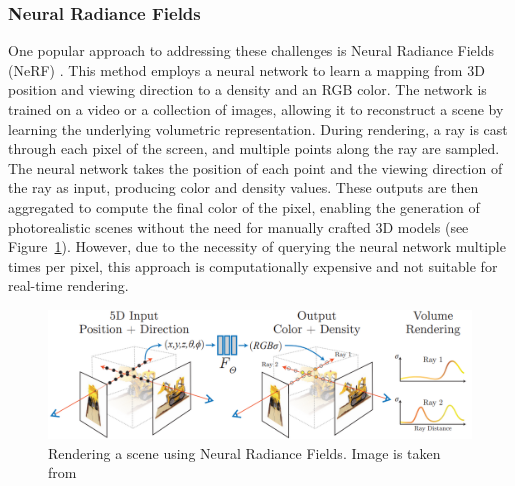 \documentclass[12pt]{article}
\begin{document}
\subsubsection{Neural Radiance Fields}
One popular approach to addressing these challenges is Neural Radiance Fields (NeRF) \parencite{Nerf}. This method employs a neural network to learn a mapping from 3D position and viewing direction to a density and an RGB color. The network is trained on a video or a collection of images, allowing it to reconstruct a scene by learning the underlying volumetric representation. During rendering, a ray is cast through each pixel of the screen, and multiple points along the ray are sampled. The neural network takes the position of each point and the viewing direction of the ray as input, producing color and density values. These outputs are then aggregated to compute the final color of the pixel, enabling the generation of photorealistic scenes without the need for manually crafted 3D models (see Figure~\ref{fig:nerf}). However, due to the necessity of querying the neural network multiple times per pixel, this approach is computationally expensive and not suitable for real-time rendering.
\begin{figure}[h!]
	\centering
	\includegraphics[width=\textwidth]{Images/Nerf.png}
	\caption{Rendering a scene using Neural Radiance Fields. Image is taken from \cite{Nerf}}
	\label{fig:nerf}
\end{figure}
\end{document}
